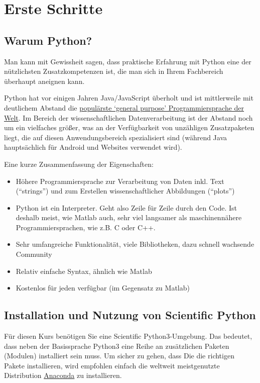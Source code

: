 \chapter{Erste Schritte}

\section{Warum Python?}

Man kann mit Gewissheit sagen, dass praktische Erfahrung mit Python eine der n\"utzlichsten Zusatzkompetenzen ist, die man sich in Ihrem Fachbereich \"uberhaupt aneignen kann.

Python hat vor einigen Jahren Java/JavaScript \"uberholt und ist mittlerweile mit deutlichem Abstand die \href{https://pypl.github.io/PYPL.html}{popul\"arste `general purpose' Programmiersprache der Welt}.
Im Bereich der wissenschaftlichen Datenverarbeitung ist der Abstand noch um ein vielfaches gr\"oßer, was an der Verf\"ugbarkeit von unz\"ahligen Zusatzpaketen liegt, die auf diesen Anwendungsbereich spezialisiert sind (w\"ahrend Java haupts\"achlich f\"ur Android und Websites verwendet wird).

Eine kurze Zusammenfassung der Eigenschaften:

\begin{itemize}
\item Höhere Programmiersprache zur Verarbeitung von Daten inkl. Text (``strings'') und zum Erstellen wissenschaftlicher Abbildungen (``plots'')
\item
Python ist ein Interpreter. Geht also Zeile für Zeile durch den Code. Ist deshalb meist, wie Matlab auch, sehr viel langsamer als maschinennähere Programmiersprachen, wie z.B. C oder C++.
\item
Sehr umfangreiche Funktionalität, viele Bibliotheken, dazu schnell wachsende Community
\item
Relativ einfache Syntax, ähnlich wie Matlab
\item
Kostenlos f\"ur jeden verfügbar (im Gegensatz zu Matlab)
\end{itemize}



\section{Installation und Nutzung von Scientific Python}

F\"ur diesen Kurs ben\"otigen Sie eine Scientific Python3-Umgebung. 
Das bedeutet, dass neben der Basissprache Python3 eine Reihe an zus\"atzlichen Paketen (Modulen) installiert sein muss.
Um sicher zu gehen, dass Die die richtigen Pakete installieren, wird empfohlen einfach die weltweit meistgenutzte Distribution \href{https://www.anaconda.com/products/individual}{Anaconda} zu installieren.

